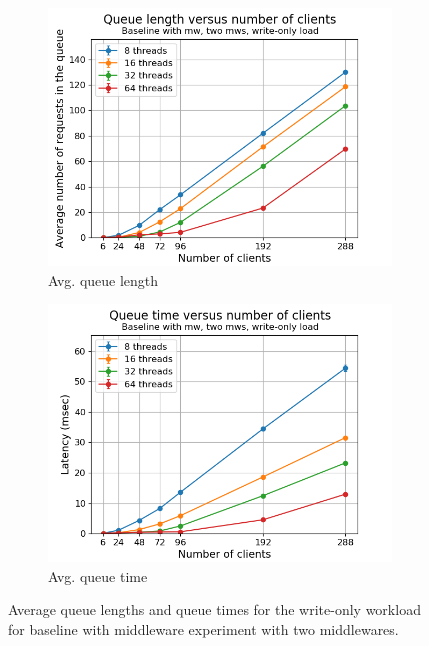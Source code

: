 \documentclass[11pt,a4paper]{article}
\begin{document}
\begin{figure}[h]
\centering
\begin{subfigure}{.5\textwidth}
  \centering
  \includegraphics[width=1.0\linewidth,trim={0px 0px 0px 0px},clip]{img/plot/mwb2-wo-qlen_mw.png}
  \caption{Avg. queue length}
  \label{fig:mwb2-wo-qlen_mw}
\end{subfigure}%
\begin{subfigure}{.5\textwidth}
  \centering
  \includegraphics[width=1.0\linewidth,trim={0px 0px 0px 0px},clip]{img/plot/mwb2-wo-qtime_mw.png}
  \caption{Avg. queue time}
  \label{fig:mwb2-wo-qtime_mw}
\end{subfigure}
\caption{Average queue lengths and queue times for the write-only workload for baseline with middleware experiment with two middlewares.}
\label{fig:mwb2-wo-qstats}
\end{figure}
\end{document}
